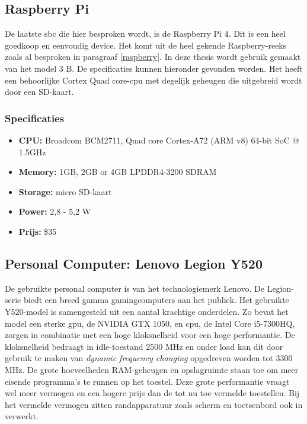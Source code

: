 

	\subsection{Raspberry Pi}
	De laatste \gls{sbc} die hier besproken wordt, is de Raspberry Pi 4\citep{bron:rpi4}. Dit is een heel goedkoop en eenvoudig device. Het komt uit de heel gekende Raspberry-reeks zoals al besproken in paragraaf \ref{raspberry}. In deze thesis wordt gebruik gemaakt van het model 3 B. De specificaties kunnen hieronder gevonden worden. Het heeft een behoorlijke Cortex Quad core-\gls{cpu} met degelijk geheugen die uitgebreid wordt door een SD-kaart. 
	
		\subsubsection{Specificaties}
		\begin{itemize}
			\item \textbf{CPU:} Broadcom BCM2711, Quad core Cortex-A72 (ARM v8) 64-bit SoC @ 1.5GHz
			\item \textbf{Memory:} 1GB, 2GB or 4GB LPDDR4-3200 SDRAM
			\item \textbf{Storage:}  micro SD-kaart
			\item \textbf{Power:} 2,8 - 5,2 W
			\item \textbf{Prijs:} \$35
		\end{itemize}	
	
	
	
	\newpage
		
	\subsection{Personal Computer: Lenovo Legion Y520}
	De gebruikte personal computer is van het technologiemerk Lenovo. De Legion-serie biedt een breed gamma gamingcomputers aan het publiek. Het gebruikte Y520-model\cite{bron:lenovolegion} is samengesteld uit een aantal krachtige onderdelen. Zo bevat het model een sterke \gls{gpu}, de NVIDIA  GTX 1050, en \gls{cpu}, de Intel Core i5-7300HQ, zorgen in combinatie met een hoge kloksnelheid voor een hoge performantie. De kloksnelheid bedraagt in idle-toestand 2500 MHz en onder load kan dit door gebruik te maken van \textit{dynamic frequency changing} opgedreven worden tot 3300 MHz. De grote hoeveelheden RAM-geheugen en opslagruimte staan toe om meer eisende programma's te runnen op het toestel. Deze grote performantie vraagt wel meer vermogen en een hogere prijs dan de tot nu toe vermelde toestellen. Bij het vermelde vermogen zitten randapparatuur zoals scherm en toetsenbord ook in verwerkt.
	

